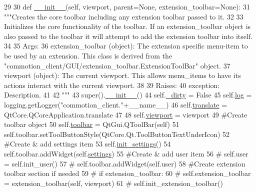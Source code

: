 \begin{DoxyCode}
29 
30     \textcolor{keyword}{def }\hyperlink{classcommotion__client_1_1GUI_1_1toolbar__builder_1_1ToolBar_a86bce4db69461426435f4d6876e3e142}{\_\_init\_\_}(self, viewport, parent=None, extension\_toolbar=None):
31         \textcolor{stringliteral}{"""Creates the core toolbar including any extension toolbar passed to it.}
32 \textcolor{stringliteral}{        }
33 \textcolor{stringliteral}{        Initializes the core functionality of the toolbar. If an extension\_toolbar object is also passed to
       the toolbar it will attempt to add the extension toolbar into itself.}
34 \textcolor{stringliteral}{        }
35 \textcolor{stringliteral}{        Args:}
36 \textcolor{stringliteral}{          extension\_toolbar (object): The extension specific menu-item to be used by an extension. This
       class is derived from the "commotion\_client/GUI/extension\_toolbar.ExtensionToolBar" object.}
37 \textcolor{stringliteral}{          viewport (object): The current viewport. This allows menu\_items to have its actions interact with
       the current viewport.}
38 \textcolor{stringliteral}{}
39 \textcolor{stringliteral}{        Raises:}
40 \textcolor{stringliteral}{          exception: Description.}
41 \textcolor{stringliteral}{        }
42 \textcolor{stringliteral}{        """}
43         super().\hyperlink{classcommotion__client_1_1GUI_1_1toolbar__builder_1_1ToolBar_a86bce4db69461426435f4d6876e3e142}{\_\_init\_\_}()
44         self.\hyperlink{classcommotion__client_1_1GUI_1_1toolbar__builder_1_1ToolBar_a6ca96405801fa2924b06cf9a496f3f30}{\_dirty} = \textcolor{keyword}{False}
45         self.\hyperlink{classcommotion__client_1_1GUI_1_1toolbar__builder_1_1ToolBar_a46cd8a80268c37d92f34582df33f3a01}{log} = logging.getLogger(\textcolor{stringliteral}{"commotion\_client."}+\_\_name\_\_)
46         self.\hyperlink{classcommotion__client_1_1GUI_1_1toolbar__builder_1_1ToolBar_a1432d3836ec381328b3eb4a4491f7b96}{translate} = QtCore.QCoreApplication.translate
47 
48         self.\hyperlink{classcommotion__client_1_1GUI_1_1toolbar__builder_1_1ToolBar_a63a7d3bd3d54d84b0d9f6b6da5c5572b}{viewport} = viewport
49         \textcolor{comment}{#Create toolbar object}
50         self.\hyperlink{classcommotion__client_1_1GUI_1_1toolbar__builder_1_1ToolBar_a604f08b7bf5e7da96522fa20892aa68a}{toolbar} = QtGui.QToolBar(self)
51         self.toolbar.setToolButtonStyle(QtCore.Qt.ToolButtonTextUnderIcon)
52         \textcolor{comment}{#Create & add settings item}
53         self.\hyperlink{classcommotion__client_1_1GUI_1_1toolbar__builder_1_1ToolBar_a075b6709f65ef1aeaca34c69dd305379}{init\_settings}()
54         self.toolbar.addWidget(self.\hyperlink{classcommotion__client_1_1GUI_1_1toolbar__builder_1_1ToolBar_a9d096d6696d3dbce5a61de16ab7206d2}{settings})
55         \textcolor{comment}{#Create & add user item}
56 \textcolor{comment}{#        self.user = self.init\_user()}
57 \textcolor{comment}{#        self.toolbar.addWidget(self.user)}
58         \textcolor{comment}{#Create extension toolbar section if needed}
59 \textcolor{comment}{#        if extension\_toolbar:}
60 \textcolor{comment}{#            self.extension\_toolbar = extension\_toolbar(self, viewport)}
61 \textcolor{comment}{#            self.init\_extension\_toolbar()}


\end{DoxyCode}
